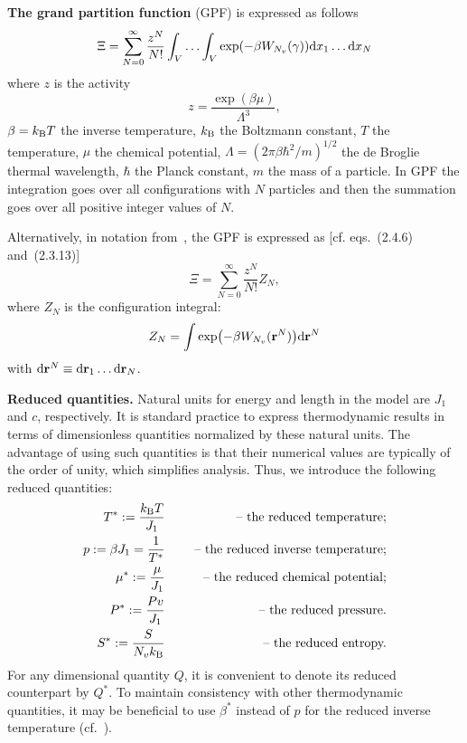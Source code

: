 \documentclass[12pt]{article}
\numberwithin{equation}{section}
\begin{document}
	\textbf{The grand partition function} (GPF) is expressed as follows~\cite[eqs.~(2.4.6) and~(2.3.13)]{HansenMcDonald13}
	\begin{equation*}
		\Xi = \sum_{N=0}^{\infty}\frac{z^N}{N!} \int_{V} \dotsc \int_{V} \exp(-\beta W_{N_v}(\gamma)) {\rm d} x_1 \dotsc {\rm d} x_N
	\end{equation*}
	where $z$ is the activity
	\begin{equation*}
		z = \frac{\exp(\beta \mu)}{\Lambda^3},
	\end{equation*}
	$\beta = k_{\rm B} T$ the inverse temperature, $k_{\rm B}$ the Boltzmann constant, $T$ the temperature, $\mu$ the chemical potential, $\Lambda = (2\pi\beta\hbar^2/m)^{1/2}$ the de Broglie thermal wavelength, $\hbar$ the Planck constant, $m$ the mass of a particle. In GPF the integration goes over all configurations with $N$ particles and then the summation goes over all positive integer values of $N$.
	
	\begin{mdframed}[linecolor=black,linewidth=1pt,leftline=true]
		Alternatively, in notation from~\cite{HansenMcDonald13}, the GPF is expressed as [cf. eqs.~(2.4.6) and~(2.3.13)]
		\begin{equation}\label{ZGR}
			\Xi=\sum_{N=0}^{\infty}\frac{z^N}{N!}Z_N,
		\end{equation}
		where $Z_N$ is the configuration integral:
		\begin{equation}
			Z_N = \int\exp(-\beta W_{N_v}(\vb{r}^N)){\rm d}\vb{r}^N
		\end{equation}
		with ${\rm d} \vb{r}^N \equiv {\rm d}{\vb r_1} \dotsc {\rm d}{\vb r_N}$.
	\end{mdframed}
	
	\textbf{Reduced quantities.} Natural units for energy and length in the model are $J_1$ and $c$, respectively. It is standard practice to express thermodynamic results in terms of dimensionless quantities normalized by these natural units. The advantage of using such quantities is that their numerical values are typically of the order of unity, which simplifies analysis. Thus, we introduce the following reduced quantities:
	\begin{eqnarray*}
		T^* := \frac{k_{\rm B} T}{J_1} & \quad & \text{ -- the reduced temperature;} 
		\\
		p := \beta J_1 = \frac{1}{T^*} & \quad & \text{ -- the reduced inverse temperature;}
		\\
		\mu^* := \frac{\mu}{J_1} & \quad & \text{ -- the reduced chemical potential;}
		\\ 
		P^* := \frac{Pv}{J_1} & & \text{ -- the reduced pressure.}
		\\
		S^* := \frac{S}{N_v k_{\rm B}} & & \text{ -- the reduced entropy.}
	\end{eqnarray*}
	For any dimensional quantity $Q$, it is convenient to denote its reduced counterpart by $Q^*$. To maintain consistency with other thermodynamic quantities, it may be beneficial to use $\beta^*$ instead of $p$ for the reduced inverse temperature (cf.~\cite{RDGMR13}).
	
\end{document}
